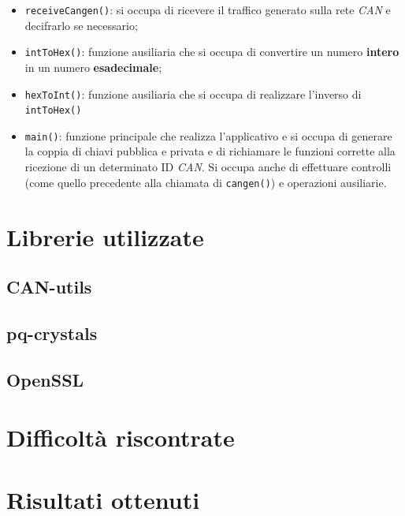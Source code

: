 \begin{itemize}
    \item \texttt{receiveCangen()}: si occupa di ricevere il traffico generato sulla rete \emph{CAN} e decifrarlo se necessario;
    \item \texttt{intToHex()}: funzione ausiliaria che si occupa di convertire un numero \textbf{intero} in un numero \textbf{esadecimale};
    \item \texttt{hexToInt()}: funzione ausiliaria che si occupa di realizzare l'inverso di \texttt{intToHex()}
    \item \texttt{main()}: funzione principale che realizza l'applicativo e si occupa di generare la coppia di chiavi pubblica e privata e di richiamare le funzioni corrette alla ricezione di un determinato ID \emph{CAN}. Si occupa anche di effettuare controlli (come quello precedente alla chiamata di \texttt{cangen()}) e operazioni ausiliarie.
\end{itemize}

\section{Librerie utilizzate}

\subsection{CAN-utils}

\subsection{pq-crystals}

\subsection{OpenSSL}

\section{Difficoltà riscontrate}

\section{Risultati ottenuti}

\newpage
